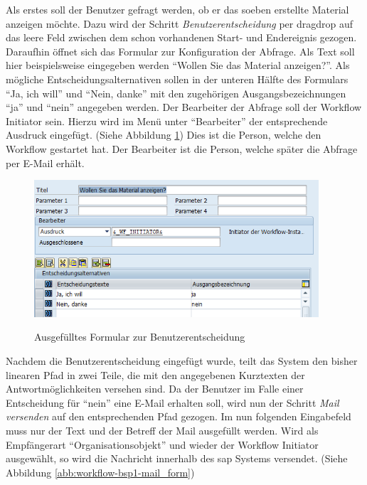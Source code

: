 Als erstes soll der Benutzer gefragt werden, ob er das soeben erstellte Material anzeigen möchte. Dazu wird der Schritt \textit{Benutzerentscheidung} per \gls{dragdrop} auf das leere Feld zwischen dem schon vorhandenen Start- und Endereignis gezogen. Daraufhin öffnet sich das Formular zur Konfiguration der Abfrage. Als Text soll hier beispielsweise eingegeben werden "`Wollen Sie das Material anzeigen?"'. Als mögliche Entscheidungsalternativen sollen in der unteren Hälfte des Formulars "`Ja, ich will"' und "`Nein, danke"' mit den zugehörigen Ausgangsbezeichnungen "`ja"' und "`nein"' angegeben werden. Der Bearbeiter der Abfrage soll der Workflow Initiator sein. Hierzu wird im Menü unter "`Bearbeiter"' der entsprechende Ausdruck eingefügt. (Siehe Abbildung \ref{abb:workflow-bsp1-benentsch_form}) Dies ist die Person, welche den Workflow gestartet hat. Der Bearbeiter ist die Person, welche später die Abfrage per E-Mail erhält.

\begin{figure}[h]
	\begin{center}
	\includegraphics[width=400px]{grafiken/wf-builder_bsp1_formular-benutzerentscheidung.png}
	\caption{Ausgefülltes Formular zur Benutzerentscheidung}
	\vspace{-10pt}
	\label{abb:workflow-bsp1-benentsch_form}
	\end{center}
\end{figure}

Nachdem die Benutzerentscheidung eingefügt wurde, teilt das System den bisher linearen Pfad in zwei Teile, die mit den angegebenen Kurztexten der Antwortmöglichkeiten versehen sind. Da der Benutzer im Falle einer Entscheidung für "`nein"' eine E-Mail erhalten soll, wird nun der Schritt \textit{Mail versenden} auf den entsprechenden Pfad gezogen. Im nun folgenden Eingabefeld muss nur der Text und der Betreff der Mail ausgefüllt werden. Wird als Empfängerart "`Organisationsobjekt"' und wieder der Workflow Initiator ausgewählt, so wird die Nachricht innerhalb des \gls{sap} Systems versendet. (Siehe Abbildung \ref{abb:workflow-bsp1-mail_form})

